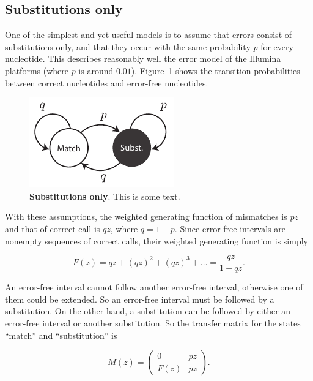 \documentclass{article}
\begin{document}
\subsection{Substitutions only}
\label{sec:substitutions}

One of the simplest and yet useful models is to assume that errors consist
of substitutions only, and that they occur with the same probability $p$
for every nucleotide. This describes reasonably well the error model of
the Illumina platforms (where $p$ is around $0.01$).
Figure~\ref{fig:subonly} shows the transition probabilities between
correct nucleotides and error-free nucleotides.

\begin{figure}[h]
\centering
\includegraphics[scale=0.9]{substitutions_only.pdf}
\caption{\textbf{Substitutions only}. 
This is some text.}
\label{fig:subonly}
\end{figure}

With these assumptions, the weighted generating function of mismatches is
$pz$ and that of correct call is $qz$, where $q=1-p$. Since 
error-free intervals are nonempty sequences of correct calls, their
weighted generating function is simply

\begin{equation}
\label{eq:Fsub}
F(z) = qz + (qz)^2 + (qz)^3 + \ldots = \frac{qz}{1-qz}.
\end{equation}

An error-free interval cannot follow another error-free interval,
otherwise one of them could be extended. So an error-free interval must be
followed by a substitution. On the other hand, a substitution can be
followed by either an error-free interval or another substitution. So the
transfer matrix for the states ``match'' and ``substitution'' is

\begin{equation*}
M(z) = \left(
\begin{matrix}
0    & pz \\
F(z) & pz
\end{matrix}
\right).
\end{equation*}
\end{document}
